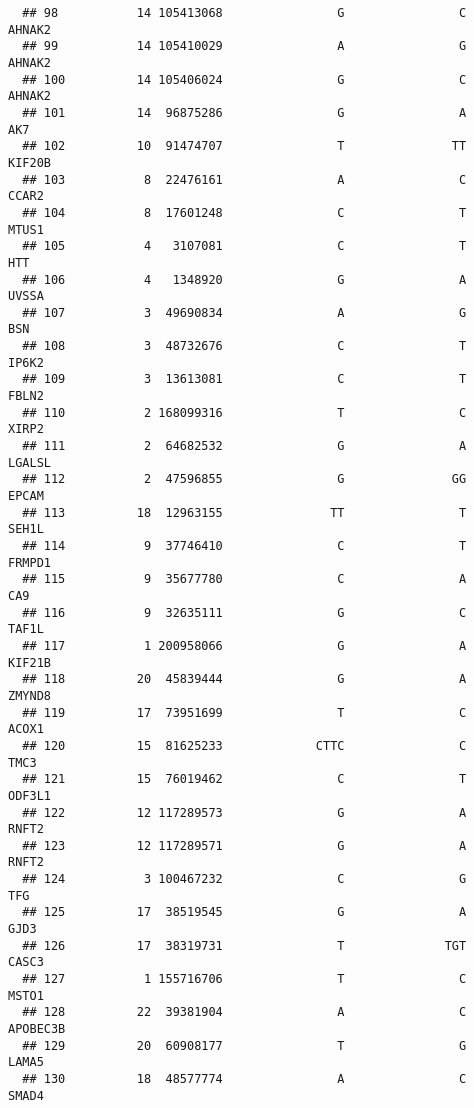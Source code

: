 \documentclass[12pt,twoside]{reedthesis}
\theoremstyle{definition}
\theoremstyle{definition}
\theoremstyle{remark}
\begin{document}
\begin{verbatim}
  ## 98           14 105413068                G                C         AHNAK2
  ## 99           14 105410029                A                G         AHNAK2
  ## 100          14 105406024                G                C         AHNAK2
  ## 101          14  96875286                G                A            AK7
  ## 102          10  91474707                T               TT         KIF20B
  ## 103           8  22476161                A                C          CCAR2
  ## 104           8  17601248                C                T          MTUS1
  ## 105           4   3107081                C                T            HTT
  ## 106           4   1348920                G                A          UVSSA
  ## 107           3  49690834                A                G            BSN
  ## 108           3  48732676                C                T          IP6K2
  ## 109           3  13613081                C                T          FBLN2
  ## 110           2 168099316                T                C          XIRP2
  ## 111           2  64682532                G                A         LGALSL
  ## 112           2  47596855                G               GG          EPCAM
  ## 113          18  12963155               TT                T          SEH1L
  ## 114           9  37746410                C                T         FRMPD1
  ## 115           9  35677780                C                A            CA9
  ## 116           9  32635111                G                C          TAF1L
  ## 117           1 200958066                G                A         KIF21B
  ## 118          20  45839444                G                A         ZMYND8
  ## 119          17  73951699                T                C          ACOX1
  ## 120          15  81625233             CTTC                C           TMC3
  ## 121          15  76019462                C                T         ODF3L1
  ## 122          12 117289573                G                A          RNFT2
  ## 123          12 117289571                G                A          RNFT2
  ## 124           3 100467232                C                G            TFG
  ## 125          17  38519545                G                A           GJD3
  ## 126          17  38319731                T              TGT          CASC3
  ## 127           1 155716706                T                C          MSTO1
  ## 128          22  39381904                A                C       APOBEC3B
  ## 129          20  60908177                T                G          LAMA5
  ## 130          18  48577774                A                C          SMAD4

\end{verbatim}
\end{document}
